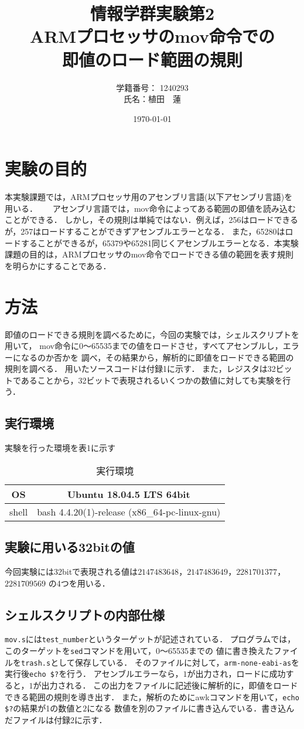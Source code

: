 \documentclass[a4j]{jarticle}
\title{情報学群実験第2 \\ ARMプロセッサのmov命令での \\ 即値のロード範囲の規則}
\author{学籍番号： 1240293 \\ 氏名：植田　蓮}
\date{\today}
\begin{document}
\maketitle
\section{実験の目的}
本実験課題では，ARMプロセッサ用のアセンブリ言語(以下アセンブリ言語)を用いる．　　
アセンブリ言語では，mov命令によってある範囲の即値を読み込むことができる．
しかし，その規則は単純ではない．例えば，256はロードできるが，257はロードすることができずアセンブルエラーとなる．
また，65280はロードすることができるが，65379や65281同じくアセンブルエラーとなる．本実験課題の目的は，ARMプロセッサのmov命令でロードできる値の範囲を表す規則を明らかにすることである．

\section{方法}
即値のロードできる規則を調べるために，今回の実験では，シェルスクリプトを用いて，
mov命令に0〜65535までの値をロードさせ，すべてアセンブルし，エラーになるのか否かを
調べ，その結果から，解析的に即値をロードできる範囲の規則を調べる．
用いたソースコードは付録1に示す．
また，レジスタは32ビットであることから，32ビットで表現されるいくつかの数値に対しても実験を行う．

\subsection{実行環境}
実験を行った環境を表1に示す
  \begin{table}[h]
    \centering
    \caption{実行環境}
    \begin{tabular}{|c|c|}
      \hline
      OS & Ubuntu 18.04.5 LTS 64bit \\ \hline
      shell & bash 4.4.20(1)-release (x86\_64-pc-linux-gnu) \\ \hline
    \end{tabular}
  \end{table}
  
  \subsection{実験に用いる32bitの値}
  今回実験には32bitで表現される値は$2147483648$，$2147483649$，$2281701377$，$2281709569$
  の4つを用いる．

  \subsection{シェルスクリプトの内部仕様}
  \verb+mov.s+には\verb+test_number+というターゲットが記述されている．
プログラムでは，このターゲットを\verb+sed+コマンドを用いて，0〜65535までの
値に書き換えたファイルを\verb+trash.s+として保存している．
そのファイルに対して，\verb+arm-none-eabi-as+を実行後\verb+echo $?+を行う．
アセンブルエラーなら，$1$が出力され，ロードに成功すると，$1$が出力される．
この出力をファイルに記述後に解析的に，即値をロードできる範囲の規則を導き出す．
また，解析のためにawkコマンドを用いて，\verb+echo $?+の結果が1の数値と$2$になる
数値を別のファイルに書き込んでいる．書き込んだファイルは付録2に示す．
\end{document}
